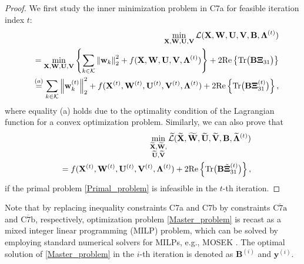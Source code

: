 \documentclass[12pt, draftclsnofoot, onecolumn]{IEEEtran}
\begin{document}
\begin{proof}
    We first study the inner minimization problem in C7a for feasible iteration index $t$: 
    \begin{eqnarray}
            &&\hspace*{4mm}\min_{{\mathbf{X},\mathbf{W},\mathbf{U},\mathbf{V}}}\mathcal{L}(\mathbf{X},\mathbf{W},\mathbf{U},\mathbf{V},\mathbf{B},\bm{\Lambda}^{(t)})\notag\\
            &&=\min_{{\mathbf{X},\mathbf{W},\mathbf{U},\mathbf{V}}}\left\{\sum_{k\in\mathcal{K}}\left\|\mathbf{w}_k\right\|_2^2+f(\mathbf{X},\mathbf{W},\mathbf{U},\mathbf{V},\bm{\Lambda}^{(t)})\right\}+2\mathrm{Re}\left\{\mathrm{Tr}\big(\mathbf{B}\bm{\Xi}_{31}\big)\right\}\notag\\
            &&\overset{(a)}{=}\sum_{k\in\mathcal{K}}\left\|\mathbf{w}_k^{(t)}\right\|_2^2+f(\mathbf{X}^{(t)},\mathbf{W}^{(t)},\mathbf{U}^{(t)},\mathbf{V}^{(t)},\bm{\Lambda}^{(t)})+2\mathrm{Re}\left\{\mathrm{Tr}\big(\mathbf{B}\bm{\Xi}_{31}^{(t)}\big)\right\},
    \end{eqnarray}
    where equality (a) holds due to the optimality condition of the Lagrangian function for a convex optimization problem. Similarly, we can also prove that 
    \begin{eqnarray}
    &&\hspace*{4mm}\min_{\substack{\widetilde{\mathbf{X}},\widetilde{\mathbf{W}},\\\widetilde{\mathbf{U}},\widetilde{\mathbf{V}}}}\widetilde{\mathcal{L}}(\widetilde{\mathbf{X}},\widetilde{\mathbf{W}},\widetilde{\mathbf{U}},\widetilde{\mathbf{V}},\mathbf{B},\widetilde{\bm{\Lambda}}^{(t)})\notag\\&&=f(\mathbf{X}^{(t)},\mathbf{W}^{(t)},\mathbf{U}^{(t)},\mathbf{V}^{(t)},\bm{\Lambda}^{(t)})+2\mathrm{Re}\left\{\mathrm{Tr}\big(\mathbf{B}\Tilde{\bm{\Xi}}_{31}^{(t)}\big)\right\},
    \end{eqnarray}
    if the primal problem \eqref{Primal_problem} is infeasible in the $t$-th iteration.
\end{proof}
Note that by replacing inequality constraints C7a and C7b by constraints $\overline{\mbox{C7a}}$ and $\overline{\mbox{C7b}}$, respectively, optimization problem \eqref{Master_problem} is recast as a mixed integer linear programming (MILP) problem, which can be solved by employing standard numerical solvers for MILPs, e.g.,  MOSEK \cite{grant2008cvx}. The optimal solution of \eqref{Master_problem} in the $i$-th iteration is denoted as $\mathbf{B}^{(i)}$ and $\mathbf{y}^{(i)}$.
\end{document}
